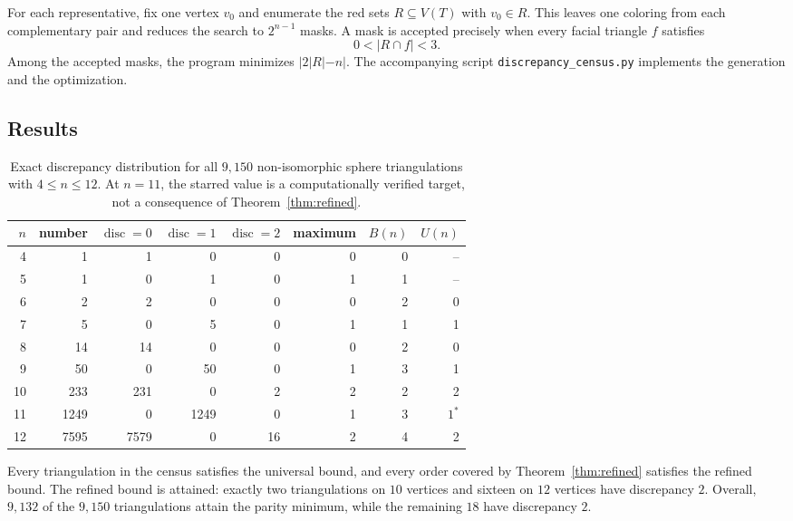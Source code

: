 \documentclass[11pt]{amsart}
\newcommand{\disc}{\operatorname{disc}}
\begin{document}
For each representative, fix one vertex $v_0$ and enumerate the red sets
$R\subseteq V(T)$ with $v_0\in R$.  This leaves one coloring from each
complementary pair and reduces the search to $2^{n-1}$ masks.  A mask is
accepted precisely when every facial triangle $f$ satisfies
\[
  0<|R\cap f|<3.
\]
Among the accepted masks, the program minimizes $|2|R|-n|$.  The accompanying
script \texttt{discrepancy\_census.py} implements the generation and the
optimization.

\subsection{Results}

\begin{table}[H]
\centering
\small
\setlength{\tabcolsep}{5pt}
\begin{tabular}{r r r r r r r r}
\toprule
$n$ & number & $\disc=0$ & $\disc=1$ & $\disc=2$
& maximum & $B(n)$ & $U(n)$ \\
\midrule
4  & 1    & 1    & 0    & 0  & 0 & 0 & -- \\
5  & 1    & 0    & 1    & 0  & 1 & 1 & -- \\
6  & 2    & 2    & 0    & 0  & 0 & 2 & 0 \\
7  & 5    & 0    & 5    & 0  & 1 & 1 & 1 \\
8  & 14   & 14   & 0    & 0  & 0 & 2 & 0 \\
9  & 50   & 0    & 50   & 0  & 1 & 3 & 1 \\
10 & 233  & 231  & 0    & 2  & 2 & 2 & 2 \\
11 & 1249 & 0    & 1249 & 0  & 1 & 3 & $1^{\ast}$ \\
12 & 7595 & 7579 & 0    & 16 & 2 & 4 & 2 \\
\bottomrule
\end{tabular}
\caption{Exact discrepancy distribution for all $9{,}150$ non-isomorphic
sphere triangulations with $4\le n\le12$.  At $n=11$, the starred value is a
computationally verified target, not a consequence of Theorem~\ref{thm:refined}.}
\label{tab:census}
\end{table}

Every triangulation in the census satisfies the universal bound, and every
order covered by Theorem~\ref{thm:refined} satisfies the refined bound.  The
refined bound is attained: exactly two triangulations on $10$ vertices and
sixteen on $12$ vertices have discrepancy $2$.  Overall, $9{,}132$ of the
$9{,}150$ triangulations attain the parity minimum, while the remaining
$18$ have discrepancy $2$.
\end{document}
